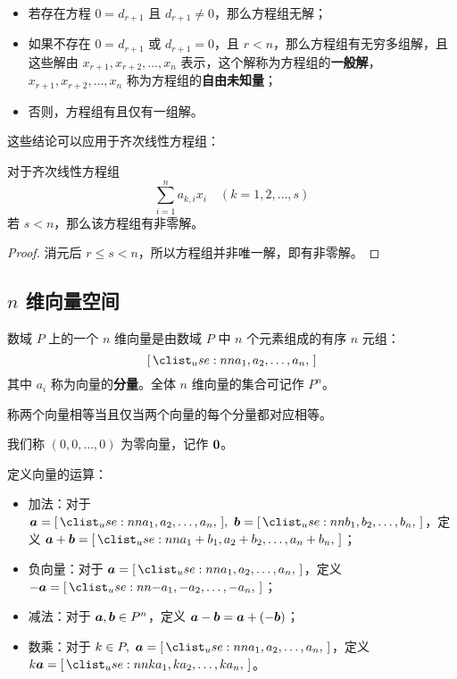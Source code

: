\begin{itemize}
	\item 若存在方程 $0 = d_{r+1}$ 且 $d_{r+1} \neq 0$，那么方程组无解；
	\item 如果不存在 $0 = d_{r+1}$ 或 $d_{r+1} = 0$，且 $r<n$，那么方程组有无穷多组解，且这些解由 $x_{r+1},x_{r+2},\dots,x_n$ 表示，这个解称为方程组的\textbf{一般解}，$x_{r+1},x_{r+2},\dots,x_n$ 称为方程组的\textbf{自由未知量}；
	\item 否则，方程组有且仅有一组解。
\end{itemize}

这些结论可以应用于齐次线性方程组：

\begin{theorem}
	对于齐次线性方程组
	$$
	\sum_{i=1}^n a_{k,i} x_i \quad (k=1,2,\dots,s)
	$$
	若 $s < n$，那么该方程组有非零解。

	\begin{proof}
		消元后 $r \le s < n$，所以方程组并非唯一解，即有非零解。
	\end{proof}
\end{theorem}

\subsection{$n$ 维向量空间}

\begin{definition}[$n$ 维向量]
	数域 $P$ 上的一个 $n$ 维向量是由数域 $P$ 中 $n$ 个元素组成的有序 $n$ 元组：
	$$
	\rvec{a_1, a_2, \dots, a_n}
	$$
	其中 $a_i$ 称为向量的\textbf{分量}。全体 $n$ 维向量的集合可记作 $P^n$。
\end{definition}

\begin{definition}[向量相等]
	称两个向量相等当且仅当两个向量的每个分量都对应相等。
\end{definition}

\begin{definition}[零向量]
	我们称 $(0,0,\dots,0)$ 为零向量，记作 $\boldsymbol{0}$。
\end{definition}

\begin{definition}[向量运算]
	定义向量的运算：

	\begin{itemize}
		\item 加法：对于 $\vect{a} = \rvec{a_1, a_2, \dots, a_n},\ \vect{b} = \rvec{b_1, b_2, \dots, b_n}$，定义 $\vect{a} + \vect{b} = \rvec{a_1 + b_1, a_2 + b_2, \dots, a_n + b_n}$；
		\item 负向量：对于 $\vect{a} = \rvec{a_1, a_2, \dots, a_n}$，定义 $-\vect{a} = \rvec{-a_1, -a_2, \dots, -a_n}$；
		\item 减法：对于 $\boldsymbol{a},\boldsymbol{b} \in P^n$，定义 $\boldsymbol{a} - \boldsymbol{b} = \boldsymbol{a} + (-\boldsymbol{b})$；
		\item 数乘：对于 $k \in P,\ \vect{a} = \rvec{a_1, a_2, \dots, a_n}$，定义 $k\vect{a} = \rvec{k a_1, k a_2, \dots, k a_n}$。
	\end{itemize}
\end{definition}


